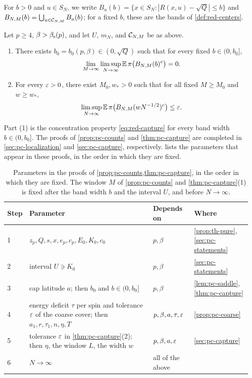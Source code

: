 For $b>0$ and $u\in S_N$, we write $B_u(b)=\{x\in S_N:|R(x,u)-\sqrt Q|\le b\}$ and $B_{N,M}(b)=\bigcup_{u\in\mathcal C_{N,M}}B_u(b)$; for a fixed $b$, these are the bands of \cref{def:red-centers}.

\begin{theorem}\label{thm:pc-capture}
Let $p\ge4$, $\beta>\beta_{\mathrm s}(p)$, and let $U$, $m_N$, and $\mathcal C_{N,M}$ be as above.
\begin{enumerate}
\item There exists $b_0=b_0(p,\beta)\in(0,\sqrt Q)$ such that for every fixed $b\in(0,b_0]$,
\begin{equation}\label{eq:pc-capture}
\lim_{M\to\infty}\limsup_{N\to\infty}\mathbb E\,\pi\bigl(B_{N,M}(b)^c\bigr)=0.
\end{equation}
\item For every $\varepsilon>0$, there exist $M_0,w_*>0$ such that for all fixed $M\ge M_0$ and $w\ge w_*$,
\begin{equation}\label{eq:pc-micro}
\limsup_{N\to\infty}\mathbb E\,\pi\bigl(B_{N,M}(wN^{-1/2})^c\bigr)\le\varepsilon.
\end{equation}
\end{enumerate}
\end{theorem}

Part (1) is the concentration property \eqref{eq:red-capture} for every band width $b\in(0,b_0]$. The proofs of \cref{prop:pc-counts} and \cref{thm:pc-capture} are completed in \cref{sec:pc-localization} and \cref{sec:pc-capture}, respectively.  lists the parameters that appear in these proofs, in the order in which they are fixed.

\begin{table}[ht]
\centering\small
\begin{tabular}{@{}l>{\raggedright\arraybackslash}p{4.6cm}>{\raggedright\arraybackslash}p{2.9cm}>{\raggedright\arraybackslash}p{3.2cm}@{}}
\toprule
Step & Parameter & Depends on & Where\\
\midrule
1 & $z_p,Q,s,x,e_p,c_p,E_0,K_0,c_0$ & $p,\beta$ & \cref{prop:th-pure}, \cref{sec:pc-statements}\\
2 & interval $U\ni K_0$ & $p,\beta$ & \cref{sec:pc-statements}\\
3 & cap latitude $a$; then $b_0$ and $b\in(0,b_0]$ & $p,\beta$ & \cref{lem:pc-saddle}, \cref{thm:pc-capture}\\
4 & energy deficit $\tau$ per spin and tolerance $\varepsilon$ of the coarse cover; then $a_1,r,\tau_1,n,\eta,T$ & $p,\beta,a,\tau,\varepsilon$ & \cref{prop:pc-coarse}\\
5 & tolerance $\varepsilon$ in \cref{thm:pc-capture}(2); then $\eta$, the window $L$, the width $w$ & $p,\beta,a,\varepsilon$ & \cref{sec:pc-capture}\\
6 & $N\to\infty$ & all of the above & \\
\bottomrule
\end{tabular}
\caption{Parameters in the proofs of \cref{prop:pc-counts,thm:pc-capture}, in the order in which they are fixed. The window $M$ of \cref{prop:pc-counts} and \cref{thm:pc-capture}(1) is fixed after the band width $b$ and the interval $U$, and before $N\to\infty$.}
\label{tab:pc-parameters}
\end{table}

